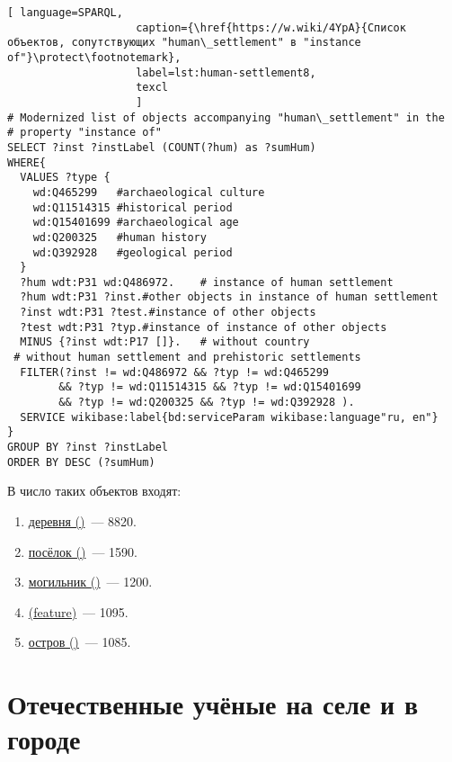 \lstset{numbers=left, firstnumber=1, frame=single}
\begin{lstlisting}[ language=SPARQL, 
                    caption={\href{https://w.wiki/4YpA}{Cписок объектов, сопутствующих "human\_settlement" в "instance of"}\protect\footnotemark},
                    label=lst:human-settlement8,
                    texcl 
                    ]
# Modernized list of objects accompanying "human\_settlement" in the 
# property "instance of"
SELECT ?inst ?instLabel (COUNT(?hum) as ?sumHum)
WHERE{
  VALUES ?type {
    wd:Q465299   #archaeological culture 
    wd:Q11514315 #historical period
    wd:Q15401699 #archaeological age
    wd:Q200325   #human history
    wd:Q392928   #geological period
  }
  ?hum wdt:P31 wd:Q486972.    # instance of human settlement
  ?hum wdt:P31 ?inst.#other objects in instance of human settlement
  ?inst wdt:P31 ?test.#instance of other objects 
  ?test wdt:P31 ?typ.#instance of instance of other objects 
  MINUS {?inst wdt:P17 []}.   # without country
 # without human settlement and prehistoric settlements
  FILTER(?inst != wd:Q486972 && ?typ != wd:Q465299 
		&& ?typ != wd:Q11514315 && ?typ != wd:Q15401699 
		&& ?typ != wd:Q200325 && ?typ != wd:Q392928 ). 
  SERVICE wikibase:label{bd:serviceParam wikibase:language"ru, en"}
}
GROUP BY ?inst ?instLabel
ORDER BY DESC (?sumHum)
\end{lstlisting}%

В число таких объектов входят:
\begin{enumerate} 
  \item \href{http://www.wikidata.org/entity/Q5084}{ деревня ()}~--- \num{8820}.
  \item \href{http://www.wikidata.org/entity/Q2514025}{ посёлок ()}~--- \num{1590}.
  \item \href{http://www.wikidata.org/entity/Q2593777}{ могильник ()}~--- \num{1200}.
  \item \href{http://www.wikidata.org/entity/Q814254}{  (feature)}~--- \num{1095}.
  \item \href{http://www.wikidata.org/entity/Q23442}{ остров ()}~--- \num{1085}.
\end{enumerate}

\section{Отечественные учёные на селе и в городе}

